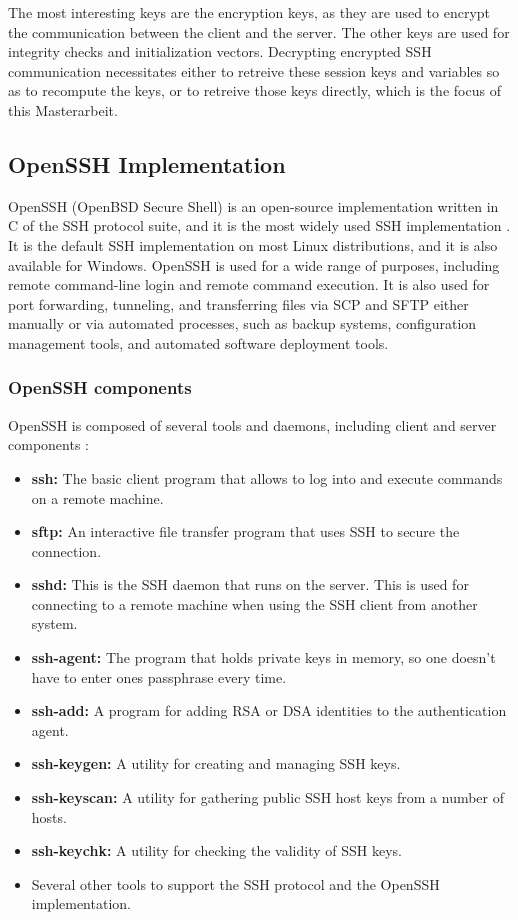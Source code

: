     The most interesting keys are the encryption keys, as they are used to encrypt the communication between the client and the server. The other keys are used for integrity checks and initialization vectors. Decrypting encrypted SSH communication necessitates either to retreive these session keys and variables so as to recompute the keys, or to retreive those keys directly, which is the focus of this Masterarbeit. 

    \subsection{OpenSSH Implementation}
    OpenSSH (OpenBSD Secure Shell) is an open-source implementation written in C of the SSH protocol suite, and it is the most widely used SSH implementation \cite{OpenSSHUnderHood07}. It is the default SSH implementation on most Linux distributions, and it is also available for Windows. OpenSSH is used for a wide range of purposes, including remote command-line login and remote command execution. It is also used for port forwarding, tunneling, and transferring files via SCP and SFTP either manually or via automated processes, such as backup systems, configuration management tools, and automated software deployment tools. 

    \subsubsection{OpenSSH components}
    OpenSSH is composed of several tools and daemons, including client and server components \cite{PortableOpenSSHGitHub}:
    \begin{itemize}
        \item \textbf{ssh:} The basic client program that allows to log into and execute commands on a remote machine.
        \item \textbf{sftp:} An interactive file transfer program that uses SSH to secure the connection.
        \item \textbf{sshd:} This is the SSH daemon that runs on the server. This is used for connecting to a remote machine when using the SSH client from another system.
        \item \textbf{ssh-agent:} The program that holds private keys in memory, so one doesn't have to enter ones passphrase every time.
        \item \textbf{ssh-add:} A program for adding RSA or DSA identities to the authentication agent.
        \item \textbf{ssh-keygen:} A utility for creating and managing SSH keys.
        \item \textbf{ssh-keyscan:} A utility for gathering public SSH host keys from a number of hosts.
        \item \textbf{ssh-keychk:} A utility for checking the validity of SSH keys.
        \item Several other tools to support the SSH protocol and the OpenSSH implementation.
    \end{itemize}

